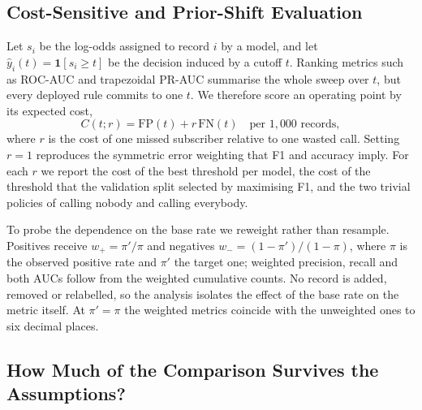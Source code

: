 
\subsection{Cost-Sensitive and Prior-Shift Evaluation}

Let $s_i$ be the log-odds assigned to record $i$ by a model, and let
$\hat y_i(t)=\mathbf{1}[s_i\ge t]$ be the decision induced by a cutoff $t$.
Ranking metrics such as ROC-AUC and trapezoidal PR-AUC summarise the whole
sweep over $t$, but every deployed rule commits to one $t$. We therefore
score an operating point by its expected cost,
\begin{equation}
C(t;r)=\mathrm{FP}(t)+r\,\mathrm{FN}(t)
\quad\text{per }1{,}000\text{ records},
\label{eq:d-cost}
\end{equation}
where $r$ is the cost of one missed subscriber relative to one wasted call.
Setting $r=1$ reproduces the symmetric error weighting that F1 and accuracy
imply. For each $r$ we report the cost of the best threshold per model, the
cost of the threshold that the validation split selected by maximising F1,
and the two trivial policies of calling nobody and calling everybody.

To probe the dependence on the base rate we reweight rather than resample.
Positives receive $w_{+}=\pi'/\pi$ and negatives $w_{-}=(1-\pi')/(1-\pi)$,
where $\pi$ is the observed positive rate and $\pi'$ the target one; weighted
precision, recall and both AUCs follow from the weighted cumulative counts.
No record is added, removed or relabelled, so the analysis isolates the
effect of the base rate on the metric itself. At $\pi'=\pi$ the weighted
metrics coincide with the unweighted ones to six decimal places.

\subsection{How Much of the Comparison Survives the Assumptions?}

